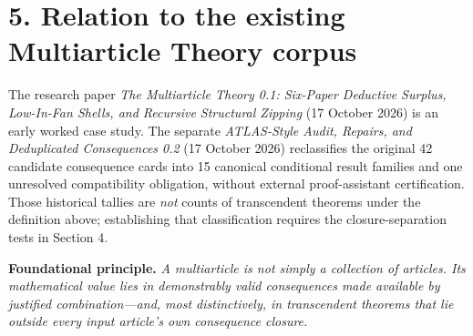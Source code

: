 \documentclass[10pt]{article}
\theoremstyle{simple}
\begin{document}
\section{5. Relation to the existing Multiarticle Theory corpus}
The research paper \emph{The Multiarticle Theory 0.1: Six-Paper Deductive Surplus, Low-In-Fan Shells, and Recursive Structural Zipping} (17 October 2026) is an early worked case study. The separate \emph{ATLAS-Style Audit, Repairs, and Deduplicated Consequences 0.2} (17 October 2026) reclassifies the original 42 candidate consequence cards into 15 canonical conditional result families and one unresolved compatibility obligation, without external proof-assistant certification. Those historical tallies are \emph{not} counts of transcendent theorems under the definition above; establishing that classification requires the closure-separation tests in Section 4.

\medskip
\noindent\textbf{Foundational principle.} \emph{A multiarticle is not simply a collection of articles. Its mathematical value lies in demonstrably valid consequences made available by justified combination---and, most distinctively, in transcendent theorems that lie outside every input article's own consequence closure.}
\end{document}

